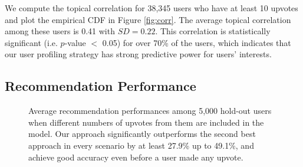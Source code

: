 \documentclass[conference]{IEEEtran}
\begin{document}
We compute the topical correlation for 38,345 users who have at least 10 upvotes and plot the empirical CDF in Figure \ref{fig:corr}. The average topical correlation among these users is 0.41 with $SD=0.22$. This correlation is statistically significant (i.e. $p$-value $<$ 0.05) for over 70\% of the users, which indicates that our user profiling strategy has strong predictive power for users' interests.

\subsection{Recommendation Performance}\label{sec:rec_perf}
\begin{figure}[!t]
\centering
{}
\label{fig_first_case}
\quad\quad
{}
\caption{Average recommendation performances among 5,000 hold-out users when different numbers of upvotes from them are included in the model. Our approach significantly outperforms the second best approach in every scenario by at least 27.9\% up to 49.1\%, and achieve good accuracy even before a user made any upvote.}
\label{fig:rec_perf}
\end{figure}
\end{document}
